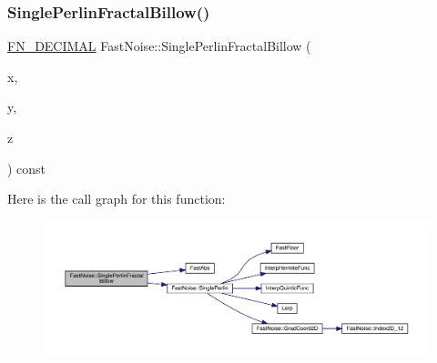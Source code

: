 \subsubsection{\texorpdfstring{Single\+Perlin\+Fractal\+Billow()}{SinglePerlinFractalBillow()}\hspace{0.1cm}{\footnotesize\ttfamily [2/2]}}
{\footnotesize\ttfamily \mbox{\hyperlink{_fast_noise_8h_a75a9ef6d2541c4921815b885bfd449c3}{F\+N\+\_\+\+D\+E\+C\+I\+M\+AL}} Fast\+Noise\+::\+Single\+Perlin\+Fractal\+Billow (\begin{DoxyParamCaption}\item[{\mbox{\hyperlink{_fast_noise_8h_a75a9ef6d2541c4921815b885bfd449c3}{F\+N\+\_\+\+D\+E\+C\+I\+M\+AL}}}]{x,  }\item[{\mbox{\hyperlink{_fast_noise_8h_a75a9ef6d2541c4921815b885bfd449c3}{F\+N\+\_\+\+D\+E\+C\+I\+M\+AL}}}]{y,  }\item[{\mbox{\hyperlink{_fast_noise_8h_a75a9ef6d2541c4921815b885bfd449c3}{F\+N\+\_\+\+D\+E\+C\+I\+M\+AL}}}]{z }\end{DoxyParamCaption}) const\hspace{0.3cm}{\ttfamily [private]}}

Here is the call graph for this function\+:
\nopagebreak
\begin{figure}[H]
\begin{center}
\leavevmode
\includegraphics[width=350pt]{class_fast_noise_a4e99adf451ddbd11a425a0909b2ae7e1_cgraph}
\end{center}
\end{figure}
\mbox{\label{class_fast_noise_a6f38e0737ecab4f680e41936f5381141}} 
